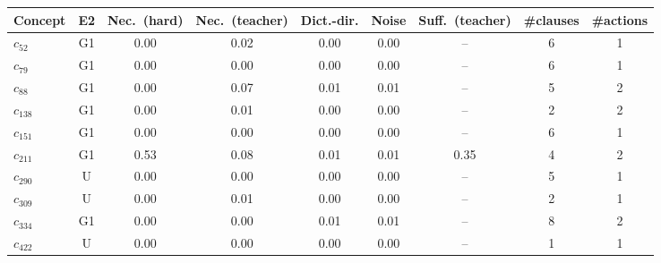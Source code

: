\begin{tabular}{lcccccccc}
\toprule
Concept & E2 & Nec.\ (hard) & Nec.\ (teacher) & Dict.-dir. & Noise & Suff.\ (teacher) & \#clauses & \#actions \\
\midrule
$c_{52}$ & G1 & 0.00 & 0.02 & 0.00 & 0.00 & -- & 6 & 1 \\
$c_{79}$ & G1 & 0.00 & 0.00 & 0.00 & 0.00 & -- & 6 & 1 \\
$c_{88}$ & G1 & 0.00 & 0.07 & 0.01 & 0.01 & -- & 5 & 2 \\
$c_{138}$ & G1 & 0.00 & 0.01 & 0.00 & 0.00 & -- & 2 & 2 \\
$c_{151}$ & G1 & 0.00 & 0.00 & 0.00 & 0.00 & -- & 6 & 1 \\
$c_{211}$ & G1 & 0.53 & 0.08 & 0.01 & 0.01 & 0.35 & 4 & 2 \\
$c_{290}$ & U & 0.00 & 0.00 & 0.00 & 0.00 & -- & 5 & 1 \\
$c_{309}$ & U & 0.00 & 0.01 & 0.00 & 0.00 & -- & 2 & 1 \\
$c_{334}$ & G1 & 0.00 & 0.00 & 0.01 & 0.01 & -- & 8 & 2 \\
$c_{422}$ & U & 0.00 & 0.00 & 0.00 & 0.00 & -- & 1 & 1 \\
\bottomrule
\end{tabular}